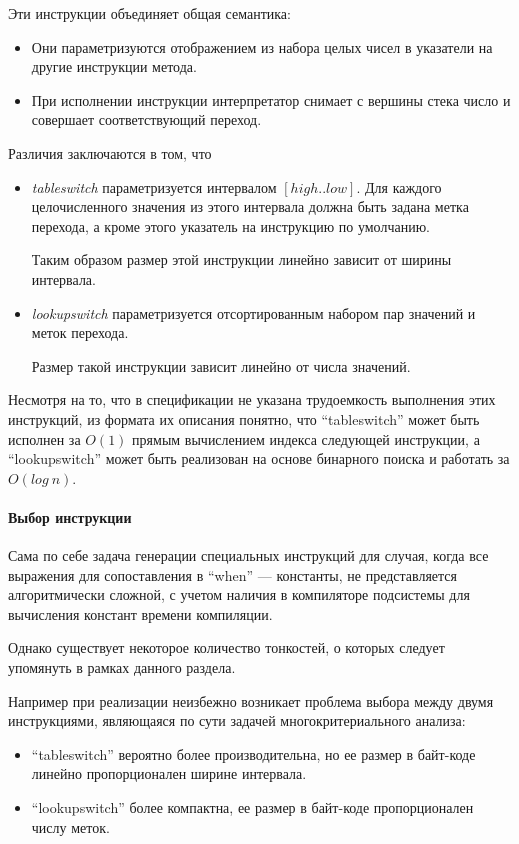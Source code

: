 Эти инструкции объединяет общая семантика:
\begin{itemize}
    \item Они параметризуются отображением из набора целых чисел в указатели на другие инструкции
    метода.
    \item При исполнении инструкции интерпретатор снимает с вершины стека число и совершает
    соответствующий переход.
\end{itemize}

Различия заключаются в том, что
\begin{itemize}
    \item \textit{tableswitch} параметризуется интервалом $[high..low]$.
    Для каждого целочисленного значения из этого интервала должна быть задана метка перехода,
    а кроме этого указатель на инструкцию по умолчанию.

    Таким образом размер этой инструкции линейно зависит от ширины интервала.
    \item \textit{lookupswitch} параметризуется отсортированным набором пар значений и меток
    перехода.

    Размер такой инструкции зависит линейно от числа значений.
\end{itemize}

Несмотря на то, что в спецификации не указана трудоемкость выполнения этих инструкций, из формата
их описания понятно, что ``tableswitch'' может быть исполнен за $O(1)$ прямым вычислением индекса
следующей инструкции, а ``lookupswitch'' может быть реализован на основе бинарного поиска и
работать за $O(log\ n)$.

\paragraph{Выбор инструкции}
Сама по себе задача генерации специальных инструкций для случая, когда все выражения
для сопоставления в ``when'' --- константы, не представляется алгоритмически сложной, с учетом
наличия в компиляторе подсистемы для вычисления констант времени компиляции.

Однако существует некоторое количество тонкостей, о которых следует упомянуть в рамках данного
раздела.

Например при реализации неизбежно возникает проблема выбора между двумя инструкциями,
являющаяся по сути задачей многокритериального анализа:
\begin{itemize}
    \item ``tableswitch'' вероятно более производительна, но ее размер в байт-коде линейно
    пропорционален ширине интервала.
    \item ``lookupswitch'' более компактна, ее размер в байт-коде пропорционален числу меток.
\end{itemize}

